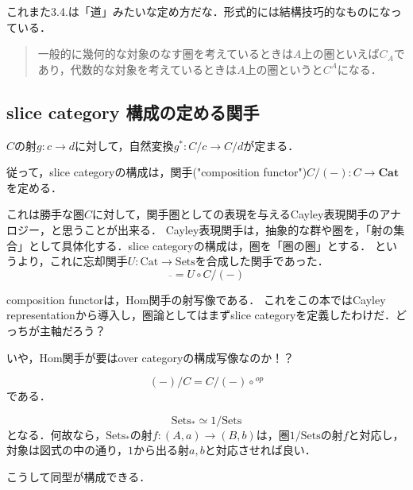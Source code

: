 \documentclass[uplatex, 12pt, dvipdfmx]{jsarticle}
\begin{document}
\begin{remark*}
    これまた3.4.は「道」みたいな定め方だな．形式的には結構技巧的なものになっている．
    \begin{quote}
        一般的に幾何的な対象のなす圏を考えているときは$A$上の圏といえば$C_A$であり，代数的な対象を考えているときは$A$上の圏というと$C^A$になる．
    \end{quote}
\end{remark*}

\subsection*{slice category 構成の定める関手}

$C$の射$g:c\to d$に対して，自然変換$g^*:C/c\to C/d$が定まる．
\begin{center}\end{center}

従って，slice categoryの構成は，関手("composition functor")$C/(-):C\to \mathbf{Cat}$を定める．

これは勝手な圏$C$に対して，関手圏としての表現を与えるCayley表現関手のアナロジー，と思うことが出来る．
Cayley表現関手は，抽象的な群や圏を，「射の集合」として具体化する．slice categoryの構成は，圏を「圏の圏」とする．
というより，これに忘却関手$U:\mathrm{Cat}\to\mathrm{Sets}$を合成した関手であった．
\[ \overline{　} = U\circ C/(-) \]

\begin{remark*}
    composition functorは，Hom関手の射写像である．
    これをこの本ではCayley representationから導入し，圏論としてはまずslice categoryを定義したわけだ．どっちが主軸だろう？

    いや，Hom関手が要はover categoryの構成写像なのか！？
\end{remark*}

\begin{proposition*}
    \[ (-)/C = C/(-)\circ {}^{op} \]
    である．
\end{proposition*}

\begin{example}
    \[\mathrm{Sets}_*\simeq 1/\mathrm{Sets}\]
    となる．何故なら，$\mathrm{Sets}_*$の射$f:(A,a)\to (B,b)$は，圏$1/\mathrm{Sets}$の射$f$と対応し，対象は図式の中の通り，$1$から出る射$a,b$と対応させれば良い．
    \begin{center}
    \end{center}
    こうして同型が構成できる．
\end{example}
\end{document}
